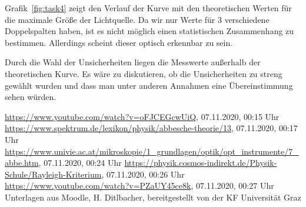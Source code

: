 \documentclass{article}
\begin{document}
Grafik~\ref{fig:task4} zeigt den Verlauf der Kurve mit den theoretischen Werten für die maximale Größe der Lichtquelle. Da wir nur Werte für 3 verschiedene Doppelspalten haben, ist es nicht möglich einen statistischen Zusammenhang zu bestimmen. Allerdings scheint dieser optisch erkennbar zu sein.

Durch die Wahl der Unsicherheiten liegen die Messwerte außerhalb der theoretischen Kurve. Es wäre zu diskutieren, ob die Unsicherheiten zu streng gewählt wurden und dass man unter anderen Annahmen eine Übereinstimmung sehen würden.







%

%


%


\newpage

\begin{thebibliography}{9}
 \url{https://www.youtube.com/watch?v=oFJCEGcwUiQ}, 07.11.2020, 00:15 Uhr
 \url{https://www.spektrum.de/lexikon/physik/abbesche-theorie/13}, 07.11.2020, 00:17 Uhr
 \url{https://www.univie.ac.at/mikroskopie/1_grundlagen/optik/opt_instrumente/7_abbe.htm}, 07.11.2020, 00:24 Uhr
 \url{https://physik.cosmos-indirekt.de/Physik-Schule/Rayleigh-Kriterium}, 07.11.2020, 00:26 Uhr
 \url{https://www.youtube.com/watch?v=PZaUY45ce8k}, 07.11.2020, 00:27 Uhr
 Unterlagen aus Moodle, H. Ditlbacher, bereitgestellt von der KF Universität Graz
\end{thebibliography}
\end{document}
